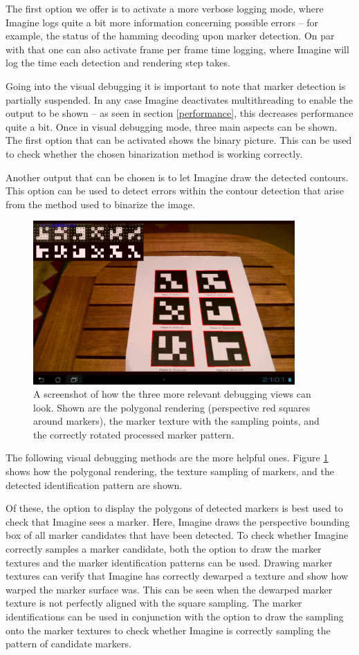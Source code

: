 The first option we offer is to activate a more verbose logging mode, where Imagine logs quite a bit more information concerning possible errors – for example, the status of the hamming decoding upon marker detection.
On par with that one can also activate frame per frame time logging, where Imagine will log the time each detection and rendering step takes.

Going into the visual debugging it is important to note that marker detection is partially suspended.
In any case Imagine deactivates multithreading to enable the output to be shown – as seen in section \ref{performance}, this decreases performance quite a bit.
Once in visual debugging mode, three main aspects can be shown.
The first option that can be activated shows the binary picture.
This can be used to check whether the chosen binarization method is working correctly.

Another output that can be chosen is to let Imagine draw the detected contours.
This option can be used to detect errors within the contour detection that arise from the method used to binarize the image.

\begin{figure}
	\centering
	\includegraphics[width=10cm]{img/debugging_view.png}
	\caption[Debugging View]{A screenshot of how the three more relevant debugging views can look. Shown are the polygonal rendering (perspective red squares around markers), the marker texture with the sampling points, and the correctly rotated processed marker pattern.}
	\label{fig:debugging_view}
\end{figure}

The following visual debugging methods are the more helpful ones.
Figure \ref{fig:debugging_view} shows how the polygonal rendering, the texture sampling of markers, and the detected identification pattern are shown.

Of these, the option to display the polygons of detected markers is best used to check that Imagine sees a marker.
Here, Imagine draws the perspective bounding box of all marker candidates that have been detected.
To check whether Imagine correctly samples a marker candidate, both the option to draw the marker textures and the marker identification patterns can be used.
Drawing marker textures can verify that Imagine has correctly dewarped a texture and show how warped the marker surface was.
This can be seen when the dewarped marker texture is not perfectly aligned with the square sampling.
The marker identifications can be used in conjunction with the option to draw the sampling onto the marker textures to check whether Imagine is correctly sampling the pattern of candidate markers.

